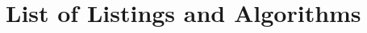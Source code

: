 \listoffigures

\listoftables

\chapter{List of Listings and Algorithms}
	
\let\LaTeXStandardClearpage\clearpage
\let\clearpage\relax  %
\renewcommand{\listalgorithmcfname}{Algorithms}

\lstlistoflistings

\listofalgorithms

\let\clearpage\LaTeXStandardClearpage %
